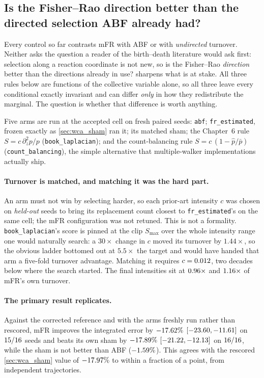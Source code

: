 \subsection{Is the Fisher--Rao direction better than the directed selection ABF already had?}
\label{sec:wca_q1}
Every control so far contrasts mFR with ABF or with \emph{undirected} turnover. Neither asks
the question a reader of the birth--death literature would ask first: selection along a
reaction coordinate is not new, so is the Fisher--Rao \emph{direction} better than the
directions already in use?  sharpens what is at stake. All three
rules below are functions of the collective variable alone, so all three leave every
conditional exactly invariant and can differ \emph{only} in how they redistribute the
marginal. The question is whether that difference is worth anything.

Five arms are run at the accepted cell on \QoneSeeds{} fresh paired seeds: \texttt{abf};
\texttt{fr\_estimated}, frozen exactly as \cref{sec:wca_sham} ran it; its matched sham; the
Chapter~6 rule $S=c\,\partial_z^2 p/p$ (\texttt{book\_laplacian}); and the count-balancing
rule $S=c\,(1-\hat p/\bar p)$ (\texttt{count\_balancing}), the simple alternative that
multiple-walker implementations actually ship.

\paragraph{Turnover is matched, and matching it was the hard part.}
An arm must not win by selecting harder, so each prior-art intensity $c$ was chosen on
\emph{held-out} seeds to bring its replacement count closest to \texttt{fr\_estimated}'s on
the same cell; the mFR configuration was not retuned. This is not a formality.
\texttt{book\_laplacian}'s score is pinned at the clip $S_{\max}$ over the whole intensity
range one would naturally search: a $30\times$ change in $c$ moved its turnover by
$1.44\times$, so the obvious ladder bottomed out at $5.5\times$ the target and would have
handed that arm a five-fold turnover advantage. Matching it requires $c=0.012$, two
decades below where the search started. The final intensities sit at $0.96\times$
and $1.16\times$ of mFR's own turnover.

\paragraph{The primary result replicates.}
Against the corrected reference and with the arms freshly run rather than rescored, mFR
improves the integrated error by $-17.62\%$ $[-23.60, -11.61]$ on
$15/16$ seeds and beats its own sham by $-17.89\%$
$[-21.22, -12.13]$ on $16/16$, while the sham is not better than
ABF ($-1.59\%$). This agrees with the rescored \cref{sec:wca_sham} value of
$-17.97\%$ to within a fraction of a point, from independent trajectories.

